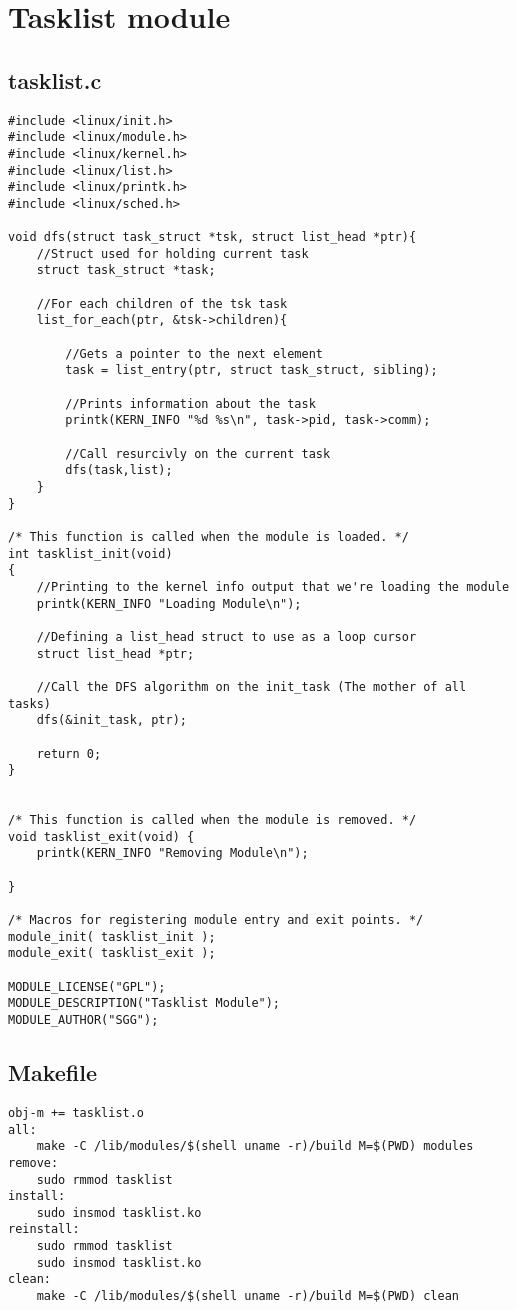 \documentclass[danish]{report}
\begin{document}
\chapter{Tasklist module}
\label{tasklist.c}

\section{tasklist.c}
\begin{lstlisting}
#include <linux/init.h>
#include <linux/module.h>
#include <linux/kernel.h>
#include <linux/list.h>
#include <linux/printk.h>
#include <linux/sched.h>

void dfs(struct task_struct *tsk, struct list_head *ptr){
    //Struct used for holding current task
    struct task_struct *task;

    //For each children of the tsk task
    list_for_each(ptr, &tsk->children){ 
            
        //Gets a pointer to the next element
        task = list_entry(ptr, struct task_struct, sibling); 

        //Prints information about the task
        printk(KERN_INFO "%d %s\n", task->pid, task->comm);

        //Call resurcivly on the current task
        dfs(task,list);
    }
}

/* This function is called when the module is loaded. */
int tasklist_init(void)
{
    //Printing to the kernel info output that we're loading the module
    printk(KERN_INFO "Loading Module\n");

    //Defining a list_head struct to use as a loop cursor
    struct list_head *ptr;

    //Call the DFS algorithm on the init_task (The mother of all tasks)
    dfs(&init_task, ptr);       

    return 0;
}


/* This function is called when the module is removed. */
void tasklist_exit(void) {
    printk(KERN_INFO "Removing Module\n");
    
}

/* Macros for registering module entry and exit points. */
module_init( tasklist_init );
module_exit( tasklist_exit );

MODULE_LICENSE("GPL");
MODULE_DESCRIPTION("Tasklist Module");
MODULE_AUTHOR("SGG");
\end{lstlisting}

\section{Makefile}
\begin{lstlisting}
obj-m += tasklist.o
all:
    make -C /lib/modules/$(shell uname -r)/build M=$(PWD) modules
remove: 
    sudo rmmod tasklist
install:
    sudo insmod tasklist.ko
reinstall:
    sudo rmmod tasklist
    sudo insmod tasklist.ko
clean:
    make -C /lib/modules/$(shell uname -r)/build M=$(PWD) clean
\end{lstlisting}
\end{document}
